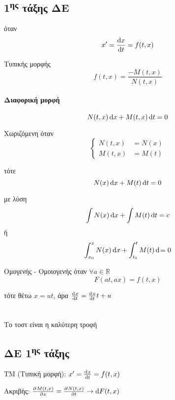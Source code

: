 \documentclass[11pt,a4paper,titlepage,final]{article}
\begin{document}
\subsection{1\textsuperscript{ης} τάξης ΔΕ}
\begin{defn}{}{}
όταν
\[
x' = \frac{\dif x}{\dif t} = f(t,x)
\]

\begin{defn}{Τυπικής μορφής}{}
\[
f(t,x) = \frac{-M(t,x)}{N(t,x)}
\]

\paragraph{Διαφορική μορφή}
\[N(t,x) \dif x + M(t,x) \dif t = 0 \]

\begin{defn}{Χωριζόμενη}{}
όταν
\[
\begin{cases}
N(t,x) &= N(x) \\
M(t,x) &= M(t)
\end{cases}
\]

τότε
\[
N(x) \dif x + M(t) \dif t = 0
\]

με λύση
\[
\int N(x) \dif x + \int M(t) \dif t = c
\]
ή
\[
\int_{x_0}^x N(x) \dif x + \int_{t_0}^t M(t) \dif = 0
\]
\end{defn}

\begin{defn}{Ομογενής - Ομοιογενής}{}
όταν \(\forall a \in  \mathbb R\)
\[
F(at,ax)=f(t,x)
\]

τότε θέτω \(x = ut\), άρα \(\od{x}{t}=\od{u}{t}t+u\)
\end{defn}


\end{defn}
\end{defn}


\section{}


Το τοστ είναι η καλύτερη τροφή


\subsection{ΔΕ 1\textsuperscript{ης} τάξης}
ΤΜ (Τυπική μορφή): \(x' = \od{x}{t} = f(t,x)\)


Ακριβής: \(
\pd{M(t,x)}{x}=\pd{N(t,x)}{t} \rightarrow \dif F(t,x)
\)
\end{document}
